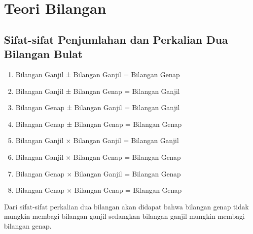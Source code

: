 \documentclass[11pt]{scrartcl}
\begin{document}
    \section{Teori Bilangan}
    \subsection{Sifat-sifat Penjumlahan dan Perkalian Dua Bilangan Bulat}
        \begin{enumerate}
            \item Bilangan Ganjil ± Bilangan Ganjil = Bilangan Genap 
            \item Bilangan Ganjil ± Bilangan Genap = Bilangan Ganjil 
            \item Bilangan Genap ± Bilangan Ganjil = Bilangan Ganjil 
            \item Bilangan Genap ± Bilangan Genap = Bilangan Genap 
            \item Bilangan Ganjil $\times$ Bilangan Ganjil = Bilangan Ganjil 
            \item Bilangan Ganjil $\times$ Bilangan Genap = Bilangan Genap 
            \item Bilangan Genap $\times$ Bilangan Ganjil = Bilangan Genap 
            \item Bilangan Genap $\times$ Bilangan Genap = Bilangan Genap
        \end{enumerate}
        Dari sifat-sifat perkalian dua bilangan akan didapat bahwa bilangan genap tidak mungkin membagi 
        bilangan ganjil sedangkan bilangan ganjil mungkin membagi bilangan genap. 
\end{document}
